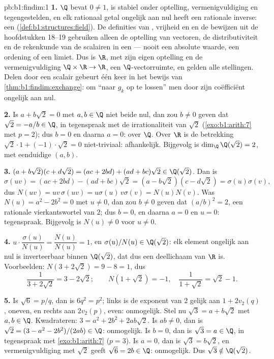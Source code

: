 \begin{solution}{pb:b1:findim:1}
\textbf{1.} $\Q$ bevat $0 \neq 1$, is stabiel onder optelling,
vermenigvuldiging en tegengestelden, en elk rationaal getal
ongelijk aan nul heeft een rationale inverse: een 
(\cref{def:b1:structures:field}). De definities van ,
vrijheid en  en de bewijzen uit de hoofdstukken 18--19
gebruiken alleen de optelling van vectoren, de distributiviteit en
de rekenkunde van de scalairen in een  --- nooit een
absolute waarde, een ordening of een limiet. Dus is $\R$, met zijn
eigen optelling en de vermenigvuldiging $\Q \times \R \to \R$, een
$\Q$-vectorruimte, en gelden alle stellingen. Delen door een
scalair gebeurt één keer in het bewijs van
\cref{thm:b1:findim:exchange}: om ``naar $g_k$ op te lossen'' 
men door zijn coëfficiënt ongelijk aan nul.

\textbf{2.} Is $a + b\sqrt2 = 0$ met $a, b \in \Q$ niet beide nul,
dan zou $b \neq 0$ geven dat $\sqrt2 = -a/b \in \Q$, in tegenspraak
met de irrationaliteit van $\sqrt2$ (\cref{exo:b1:arith:7} met $p =
2$); dus $b = 0$ en daarna $a = 0$:  over $\Q$. Over $\R$ is de
betrekking $\sqrt2\cdot 1 + (-1)\cdot\sqrt2 = 0$ niet-triviaal:
afhankelijk. Bijgevolg is $\dim_\Q \Q(\sqrt2) = 2$, met eenduidige
 $(a, b)$.

\textbf{3.} $(a + b\sqrt2)(c + d\sqrt2) = (ac + 2bd) + (ad +
bc)\sqrt2 \in \Q(\sqrt2)$. Dan is
\[
\sigma(uv) = (ac + 2bd) - (ad + bc)\sqrt2
= (a - b\sqrt2)(c - d\sqrt2) = \sigma(u)\sigma(v),
\]
dus $N(uv) = uv\,\sigma(uv) = u\sigma(u)\,v\sigma(v) = N(u)N(v)$.
Was $N(u) = a^2 - 2b^2 = 0$ met $u \neq 0$, dan zou $b \neq 0$
geven dat $(a/b)^2 = 2$, een rationale vierkantswortel van $2$; dus
$b = 0$, en daarna $a = 0$ en $u = 0$: tegenspraak. Bijgevolg is
$N(u) \neq 0$ voor $u \neq 0$.

\textbf{4.} $u \cdot \dfrac{\sigma(u)}{N(u)} = \dfrac{N(u)}{N(u)} =
1$, en $\sigma(u)/N(u) \in \Q(\sqrt2)$: elk element ongelijk aan
nul is inverteerbaar binnen $\Q(\sqrt2)$, dat dus een deellichaam
van $\R$ is. Voorbeelden: $N(3 + 2\sqrt2) = 9 - 8 = 1$, dus
\[
\frac1{3 + 2\sqrt2} = 3 - 2\sqrt2 ;
\qquad
N(1 + \sqrt2) = -1, \quad
\frac1{1 + \sqrt2} = \sqrt2 - 1 .
\]

\textbf{5.} Is $\sqrt6 = p/q$, dan is $6q^2 = p^2$; links is de
exponent van $2$ gelijk aan $1 + 2v_2(q)$, oneven, en rechts aan
$2v_2(p)$, even: onmogelijk. Stel nu $\sqrt3 = a + b\sqrt2$ met $a,
b \in \Q$. Kwadrateren: $3 = a^2 + 2b^2 + 2ab\sqrt2$. Is $ab \neq
0$, dan is $\sqrt2 = (3 - a^2 - 2b^2)/(2ab) \in \Q$: onmogelijk. Is
$b = 0$, dan is $\sqrt3 = a \in \Q$, in tegenspraak met
\cref{exo:b1:arith:7} ($p = 3$). Is $a = 0$, dan is $\sqrt3 =
b\sqrt2$, en vermenigvuldiging met $\sqrt2$ geeft $\sqrt6 = 2b \in
\Q$: onmogelijk. Dus $\sqrt3 \notin \Q(\sqrt2)$.


\end{solution}
